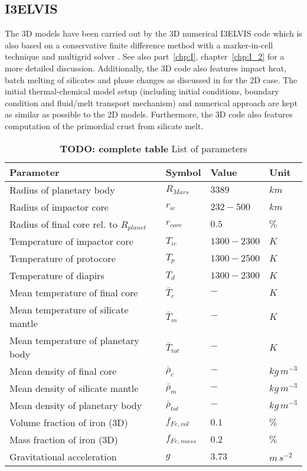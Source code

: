 \subsection{I3ELVIS}

The 3D models have been carried out by the 3D numerical I3ELVIS \citep{Gerya2007} code which is also based on a conservative finite difference method with a marker-in-cell technique and multigrid solver \citep{GeryaYuen2003,Gerya2007}.  See also part~\ref{chp:I}, chapter~\ref{chp:I_2} for a more detailed discussion. Additionally, the 3D code also features impact heat, batch melting of silicates and phase changes as discussed in \citet{Golabek2011} for the 2D case. The initial thermal-chemical model setup (including initial conditions, boundary condition and fluid/melt transport mechanism) and numerical approach are kept as similar as possible to the 2D models. Furthermore, the 3D code also features computation of the primordial crust from silicate melt.

\begin{table}[H]
\small
\centering
\begin{tabular}{p{6cm} l l l}
\toprule
Parameter & Symbol & Value & Unit\\
\midrule
Radius of planetary body 			& $R_{Mars}$ 			& $3389$ 		& $km$\\
Radius of impactor core 			& $r_{ic}$ 				& $232-500$ 	& $km$\\
Radius of final core rel. to $R_{planet}$ & $r_{core}$ 		& $0.5$ 		& $\%$\\
Temperature of impactor core 		& $T_{ic}$ 				& $1300-2300$	& $K$\\
Temperature of protocore 			& $T_p$ 				& $1300-2500$	& $K$\\
Temperature of diapirs 				& $T_d$ 				& $1300-2300$	& $K$\\
Mean temperature of final core 		& $\bar{T}_c$ 			& $-$ 		& $K$\\
Mean temperature of silicate mantle & $\bar{T}_m$ 			& $-$ 		& $K$\\
Mean temperature of planetary body 	& $\bar{T}_{tot}$ 		& $-$ 		& $K$\\
Mean density of final core			& $\bar{\rho}_c$ 		& $-$ 		& $kg\,m^{-3}$\\
Mean density of silicate mantle 	& $\bar{\rho}_m$ 		& $-$ 		& $kg\,m^{-3}$\\
Mean density of planetary body 		& $\bar{\rho}_{tot}$ 	& $-$ 		& $kg\,m^{-3}$\\
Volume fraction of iron (3D)		& $f_{Fe,vol}$ 			& $0.1$ 		& $\%$\\
Mass fraction of iron (3D)			& $f_{Fe,mass}$			& $0.2$			& $\%$\\
Gravitational acceleration			& $g$					& $3.73$		& $m\,s^{-2}$\\
\bottomrule
\end{tabular}
\caption{\textbf{TODO: complete table} List of parameters}
\label{tbl:list_of_parameters}
\end{table}
